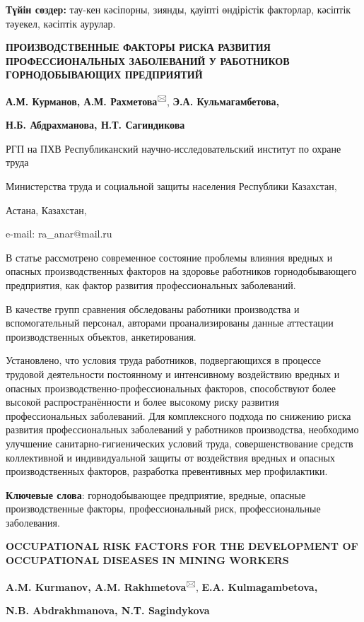 {\bfseries Түйін сөздер:} тау-кен кәсіпорны, зиянды, қауіпті өндірістік
факторлар, кәсіптік тәуекел, кәсіптік аурулар.

{\bfseries ПРОИЗВОДСТВЕННЫЕ ФАКТОРЫ РИСКА РАЗВИТИЯ ПРОФЕССИОНАЛЬНЫХ
ЗАБОЛЕВАНИЙ У РАБОТНИКОВ ГОРНОДОБЫВАЮЩИХ ПРЕДПРИЯТИЙ}

{\bfseries А.М. Курманов, А.М. Рахметова}\textsuperscript{🖂}, {\bfseries Э.А.
Кульмагамбетова,}

{\bfseries Н.Б. Абдрахманова, Н.Т. Сагиндикова}

РГП на ПХВ Республиканский научно-исследовательский институт по охране
труда

Министерства труда и социальной защиты населения Республики Казахстан,

Астана, Казахстан,

e-mail: ra\_anar@mail.ru

В статье рассмотрено современное состояние проблемы влияния вредных и
опасных производственных факторов на здоровье работников
горнодобывающего предприятия, как фактор развития профессиональных
заболеваний.

В качестве групп сравнения обследованы работники производства и
вспомогательный персонал, авторами проанализированы данные аттестации
производственных объектов, анкетирования.

Установлено, что условия труда работников, подвергающихся в процессе
трудовой деятельности постоянному и интенсивному воздействию вредных и
опасных производственно-профессиональных факторов, способствуют более
высокой распространённости и более высокому риску развития
профессиональных заболеваний. Для комплексного подхода по снижению риска
развития профессиональных заболеваний у работников производства,
необходимо улучшение санитарно-гигиенических условий труда,
совершенствование средств коллективной и индивидуальной защиты от
воздействия вредных и опасных производственных факторов, разработка
превентивных мер профилактики.

{\bfseries Ключевые слова}: горнодобывающее предприятие, вредные, опасные
производственные факторы, профессиональный риск, профессиональные
заболевания.

{\bfseries OCCUPATIONAL RISK FACTORS FOR THE DEVELOPMENT OF OCCUPATIONAL
DISEASES IN MINING WORKERS}

{\bfseries A.M. Kurmanov, A.M. Rakhmetova}\textsuperscript{🖂}, {\bfseries E.A.
Kulmagambetova,}

{\bfseries N.B. Abdrakhmanova, N.T. Sagindykova}

